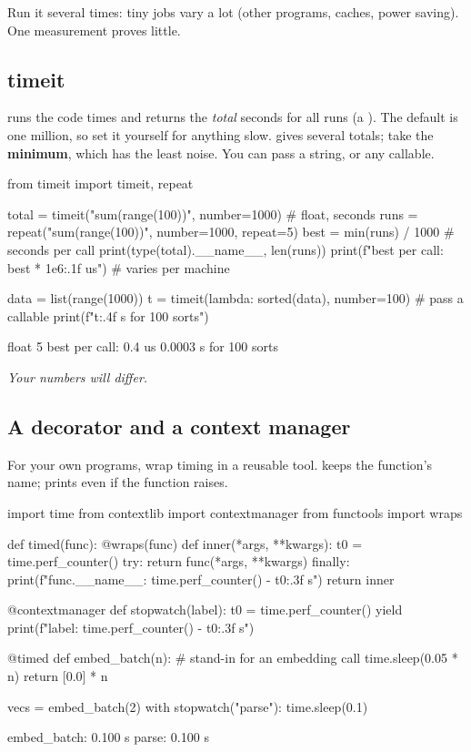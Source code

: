 Run it several times: tiny jobs vary a lot (other programs, caches, power saving). One measurement
proves little.

\subsection{timeit}

 runs the code  times and returns the \emph{total}
seconds for all runs (a ). The default  is one million, so set it
yourself for anything slow.  gives several totals; take the \textbf{minimum}, which has
the least noise. You can pass a string, or any callable.

\begin{pycode}
from timeit import timeit, repeat

total = timeit("sum(range(100))", number=1000)       # float, seconds
runs = repeat("sum(range(100))", number=1000, repeat=5)
best = min(runs) / 1000                             # seconds per call
print(type(total).__name__, len(runs))
print(f"best per call: {best * 1e6:.1f} us")        # varies per machine

data = list(range(1000))
t = timeit(lambda: sorted(data), number=100)        # pass a callable
print(f"{t:.4f} s for 100 sorts")
\end{pycode}
\begin{rawcode}
float 5
best per call: 0.4 us
0.0003 s for 100 sorts
\end{rawcode}
\noindent\textit{Your numbers will differ.}

\subsection{A decorator and a context manager}

For your own programs, wrap timing in a reusable tool.  keeps the
function's name;  prints even if the function raises.

\begin{pycode}
import time
from contextlib import contextmanager
from functools import wraps

def timed(func):
    @wraps(func)
    def inner(*args, **kwargs):
        t0 = time.perf_counter()
        try:
            return func(*args, **kwargs)
        finally:
            print(f"{func.__name__}: {time.perf_counter() - t0:.3f} s")
    return inner

@contextmanager
def stopwatch(label):
    t0 = time.perf_counter()
    yield
    print(f"{label}: {time.perf_counter() - t0:.3f} s")

@timed
def embed_batch(n):                 # stand-in for an embedding call
    time.sleep(0.05 * n)
    return [0.0] * n

vecs = embed_batch(2)
with stopwatch("parse"):
    time.sleep(0.1)
\end{pycode}
\begin{rawcode}
embed_batch: 0.100 s
parse: 0.100 s
\end{rawcode}

